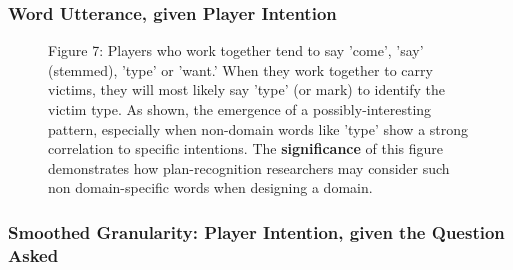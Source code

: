 \newpage

\subsubsection{Word Utterance, given Player Intention}


\begin{figure}[h!]
    \centering
    \caption{Figure 7: Players who work together tend to say  'come', 'say' (stemmed), 'type' or 'want.' When they work together to carry victims, they will most likely say 'type' (or mark) to identify the victim type. As shown, the emergence of a possibly-interesting pattern, especially when non-domain words like 'type' show a strong correlation to specific intentions. The \textbf{significance} of this figure demonstrates how plan-recognition researchers may consider such non domain-specific words when designing a domain.
}
\end{figure}








\newpage
\subsubsection{Smoothed Granularity: Player Intention, given the Question Asked}


